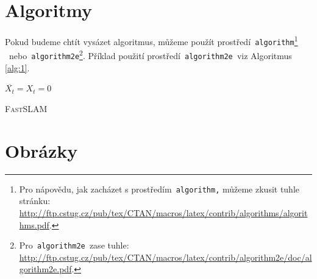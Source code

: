 \documentclass[a4paper, 11pt]{article}
\begin{document}
\newpage

\section{Algoritmy} \label{section:3}
\setlength{\parskip}{0em}
Pokud budeme chtít vysázet algoritmus, můžeme použít 
prostředí\verb| algorithm|\footnote{Pro nápovědu, jak zacházet s
prostředím\texttt{ algorithm,} můžeme zkusit tuhle stránku:\\
\url{http://ftp.cstug.cz/pub/tex/CTAN/macros/latex/contrib/algorithms/algorithms.pdf}.} \ nebo\verb| algorithm2e|\footnote{Pro\texttt{ algorithm2e }zase tuhle:
\url{http://ftp.cstug.cz/pub/tex/CTAN/macros/latex/contrib/algorithm2e/doc/algorithm2e.pdf}.}.
Příklad použití prostředí\verb| algorithm2e |viz Algoritmus \ref{alg:1}.
\bigskip

\IncMargin{1.5em}
\begin{algorithm} 
\SetNlSty{}{}{:}

\SetInd{0em}{1em}
\Indm \Indmm


\Indp \Indpp
\SetInd{1em}{1em}
\BlankLine

$\overline{X_t} = X_t = 0$\\
\caption{\textsc{Fast}SLAM} \label{alg:1}

\end{algorithm}

\section{Obrázky}
\end{document}
